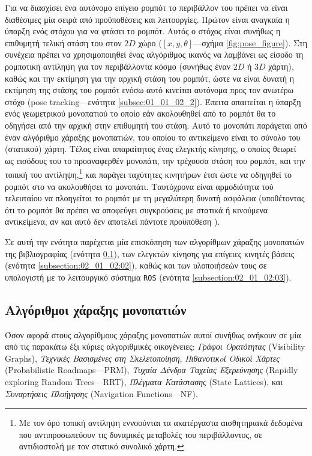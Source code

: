 Για να διασχίσει ένα αυτόνομο επίγειο ρομπότ το περιβάλλον του πρέπει να είναι
διαθέσιμες μία σειρά από προϋποθέσεις και λειτουργίες. Πρώτον είναι αναγκαία η
ύπαρξη ενός στόχου για να φτάσει το ρομπότ. Αυτός ο στόχος είναι συνήθως η
επιθυμητή τελική στάση του στον $2D$ χώρο ($[x, y, \theta]$---σχήμα
\ref{fig:pose_figure}). Στη συνέχεια πρέπει να χρησιμοποιηθεί ένας αλγόριθμος
ικανός να λαμβάνει ως είσοδο τη ρομποτική αντίληψη για τον περιβάλλοντα κόσμο
(συνήθως έναν $2D$ ή $3D$ χάρτη), καθώς και την εκτίμηση για την αρχική στάση
του ρομπότ, ώστε να είναι δυνατή η εκτίμηση της στάσης του ρομπότ ενόσω αυτό
κινείται αυτόνομα προς τον ανωτέρω στόχο (pose tracking---ενότητα
\ref{subsec:01_01_02_2}). Έπειτα απαιτείται η ύπαρξη ενός γεωμετρικού
μονοπατιού το οποίο εάν ακολουθηθεί από το ρομπότ θα το οδηγήσει από την
αρχική στην επιθυμητή του στάση. Αυτό το μονοπάτι παράγεται από έναν αλγόριθμο
χάραξης μονοπατιών, του οποίου το αντικείμενο είναι το σύνολο του (στατικού)
χάρτη. Τέλος είναι απαραίτητος ένας ελεγκτής κίνησης, ο οποίος θεωρεί ως
εισόδους του το προαναφερθέν μονοπάτι, την τρέχουσα στάση του ρομπότ, και την
τοπική του αντίληψη,\footnote{Με τον όρο τοπική αντίληψη εννοούνται τα
ακατέργαστα αισθητηριακά δεδομένα που αντιπροσωπεύουν τις δυναμικές μεταβολές
του περιβάλλοντος, σε αντιδιαστολή με τον στατικό συνολικό χάρτη.} και παράγει
ταχύτητες κινητήρων έτσι ώστε να οδηγηθεί το ρομπότ στο να ακολουθήσει το
μονοπάτι. Ταυτόχρονα είναι αρμοδιότητα τού τελευταίου να πλοηγείται το ρομπότ
με τη μεγαλύτερη δυνατή ασφάλεια (υποθέτοντας ότι το ρομπότ θα πρέπει να
αποφεύγει συγκρούσεις με στατικά ή κινούμενα αντικείμενα, αν και αυτό δεν
αποτελεί πάντοτε προϋπόθεση \cite{Gandhi2017}).

Σε αυτή την ενότητα παρέχεται μία επισκόπηση των αλγορίθμων χάραξης μονοπατιών
της βιβλιογραφίας (ενότητα \ref{subsection:02_01_02:01}), των ελεγκτών κίνησης
για επίγειες κινητές βάσεις (ενότητα \ref{subsection:02_01_02:02}), καθώς και
των υλοποιήσεών τους σε υπολογιστή με το λειτουργικό σύστημα \texttt{ROS}
(ενότητα \ref{subsection:02_01_02:03}).

\subsection{Αλγόριθμοι χάραξης μονοπατιών}
\label{subsection:02_01_02:01}

Όσον αφορά στους αλγορίθμους χάραξης μονοπατιών αυτοί συνήθως ανήκουν σε μία
από τις παρακάτω έξι κύριες αλγοριθμικές οικογένειες: \textit{Γράφοι
Ορατότητας} (Visibility Graphs), \textit{Τεχνικές Βασισμένες στη
Σκελετοποίηση}, \textit{Πιθανοτικoί Οδικοί Χάρτες} (Probabilistic
Roadmaps---PRM), \textit{Τυχαία Δένδρα Ταχείας Εξερεύνησης} (Rapidly exploring
Random Trees---RRT), \textit{Πλέγματα Κατάστασης} (State Lattices), και
\textit{Συναρτήσεις Πλοήγησης} (Navigation Functions---NF).


